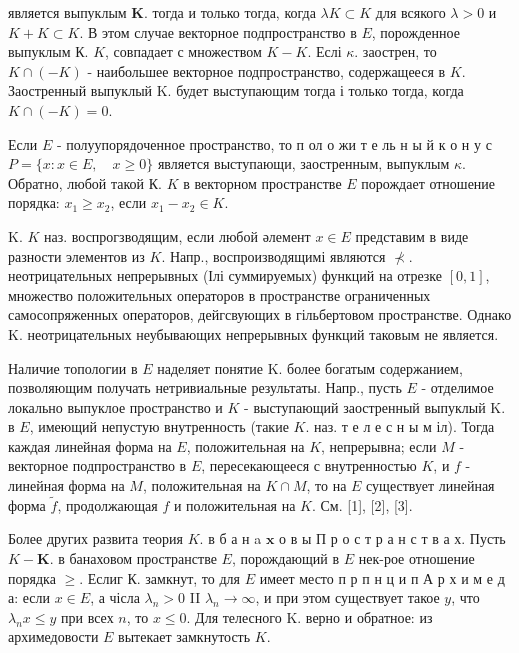 \documentclass[10pt]{article}
\begin{document}
является выпуклым $\boldsymbol{K}$. тогда и только тогда, когда $\lambda K \subset K$ для всякого $\lambda>0$ и $K+K \subset K$. В этом случае векторное подпространство в $E$, порожденное выпуклым К. $K$, совпадает с множеством $K-K$. Еслі $\kappa$. заострен, то $K \cap(-K)$ - наибольшее векторное подпространство, содержащееся в $K$. Заостренный выпуклый K. будет выступающим тогда і только тогда, когда $K \cap(-K)=0$.



Если $E$ - полуупорядоченное пространство, то п ол о жи т е ль н ы й к о н у с $P=\{x: x \in E, \quad x \geqslant 0\}$ является выступающи, заостренным, выпуклым $\kappa$. Обратно, любой такой К. $K$ в векторном пространстве $E$ порождает отношение порядка: $x_{1} \geqslant x_{2}$, если $x_{1}-x_{2} \in K$.



K. $K$ наз. воспрогзводящим, если любой әлемент $x \in E$ представим в виде разности элементов из $K$. Напр., воспроизводящимі являются $\nprec$. неотрицательных непрерывных (Ілі суммируемых) функций на отрезке $[0,1]$, множество положительных операторов в пространстве ограниченных самосопряженных операторов, дейгсвующих в гільбертовом пространстве. Однако $\mathrm{K}$. неотрицательных неубывающих непрерывных функций таковым не является.



Наличие топологии в $E$ наделяет понятие $\mathrm{K}$. более богатым содержанием, позволяющим получать нетривиальные результаты. Напр., пусть $E$ - отделимое локально выпуклое пространство и $K$ - выступающий заостренный выпуклый $\mathrm{K}$. в $E$, имеющий непустую внутренность (такие $K$. наз. т е л е с н ы м іл). Тогда каждая линейная форма на $E$, положительная на $K$, непрерывна; если $M$ - векторное подпространство в $E$, пересекающееся с внутренностью $K$, и $f$ - линейная форма на $M$, положительная на $K \cap M$, то на $E$ существует линейная форма $\tilde{f}$, продолжающая $f$ и положительная на $K$. См. [1], [2], [3].



Более других развита теория $K$. в б а н a $\mathbf{x}$ о в ы П р о с т р а н с т в а х. Пусть $K-\boldsymbol{K}$. в банаховом пространстве $E$, порождающий в $E$ нек-рое отношение порядка $\geqslant$. Еслиг К. замкнут, то для $E$ имеет место п р п н ц и п А р х и м е д а: если $x \in E$, а чісла $\lambda_{n}>0$ II $\lambda_{n} \rightarrow \infty$, и при этом существует такое $y$, что $\lambda_{n} x \leqslant y$ при всех $n$, то $x \leqslant 0$. Для телесного $\mathrm{K}$. верно и обратное: из архимедовости $E$ вытекает замкнутость $K$.
\end{document}
